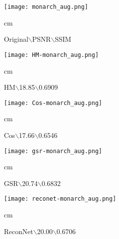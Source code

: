 \documentclass{article}
\begin{document}
\begin{figure*}[tb]
\setlength{\abovecaptionskip}{1.0pt}
\setlength{\belowcaptionskip}{-2.9pt}
\begin{minipage}[t]{0.12\textwidth}
\centering
\texttt{[image: monarch\_aug.png]}
\begin{scriptsize}
\centering
{} cm \begin{tiny}Original$\backslash$PSNR$\backslash$SSIM\end{tiny}
\end{scriptsize}
\end{minipage}
\hfill
\begin{minipage}[t]{0.12\textwidth}
\centering
\texttt{[image: HM-monarch\_aug.png]}
\begin{scriptsize}
\centering
{} cm \begin{tiny}HM$\backslash$18.85$\backslash$0.6909\end{tiny}
\end{scriptsize}
\end{minipage}
\hfill
\begin{minipage}[t]{0.12\textwidth}
\centering
\texttt{[image: Cos-monarch\_aug.png]}
\begin{scriptsize}
\centering
{} cm \begin{tiny}Cos$\backslash$17.66$\backslash$0.6546\end{tiny}
\end{scriptsize}
\end{minipage}
\hfill
\begin{minipage}[t]{0.12\textwidth}
\centering
\texttt{[image: gsr-monarch\_aug.png]}
\begin{scriptsize}
\centering
{} cm \begin{tiny}GSR$\backslash$20.74$\backslash$0.6832\end{tiny}
\end{scriptsize}
\end{minipage}
\hfill
\begin{minipage}[t]{0.12\textwidth}
\centering
\texttt{[image: reconet-monarch\_aug.png]}
\begin{scriptsize}
\centering
{} cm \begin{tiny}ReconNet$\backslash$20.00$\backslash$0.6706\end{tiny}
\end{scriptsize}
\end{minipage}
\hfill
\begin{minipage}[t]{0.12\textwidth}

\end{minipage}
\end{figure*}
\end{document}

